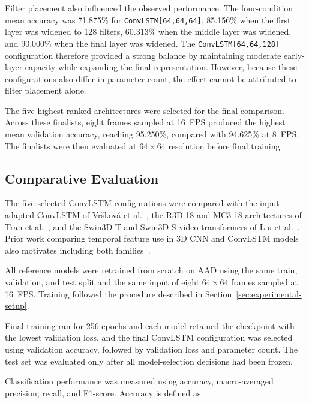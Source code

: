 \documentclass[journal,article,submit,moreauthors]{Definitions/mdpi}
\begin{document}
    Filter placement also influenced the observed performance. The four-condition mean
    accuracy was 71.875\% for \texttt{ConvLSTM[64,64,64]}, 85.156\% when the first layer was
    widened to 128 filters, 60.313\% when the middle layer was widened, and 90.000\% when
    the final layer was widened. The \texttt{ConvLSTM[64,64,128]} configuration therefore
    provided a strong balance by maintaining moderate early-layer capacity while expanding
    the final representation. However, because these configurations also differ in parameter
    count, the effect cannot be attributed to filter placement alone.

    The five highest ranked architectures were selected for the final comparison. Across
    these finalists, eight frames sampled at 16~FPS produced the highest mean validation
    accuracy, reaching 95.250\%, compared with 94.625\% at 8~FPS. The finalists were then
    evaluated at $64\times64$ resolution before final training.

    \clearpage
    \subsection{Comparative Evaluation}
    \label{sec:aad-comparison}

    The five selected ConvLSTM configurations were compared with the input-adapted
    ConvLSTM of Vršková et al.~\cite{vrskova2022}, the R3D-18 and MC3-18 architectures of
    Tran et al.~\cite{tran2018closer}, and the Swin3D-T and Swin3D-S video transformers of
    Liu et al.~\cite{liu2022videoswin}. Prior work comparing temporal feature use in 3D
    CNN and ConvLSTM models also motivates including both 
    families~\cite{manttari2021interpreting}.

    All reference models were retrained from scratch on AAD using the same train,
    validation, and test split and the same input of eight $64\times64$ frames sampled at
    16~FPS. Training followed the procedure described in 
    Section~\ref{sec:experimental-setup}.

    Final training ran for 256 epochs and each model retained the checkpoint with the
    lowest validation loss, and the final ConvLSTM configuration was selected using
    validation accuracy, followed by validation loss and parameter count. The test set
    was evaluated only after all model-selection decisions had been frozen.

    Classification performance was measured using accuracy, macro-averaged precision,
    recall, and F1-score. Accuracy is defined as
\end{document}
